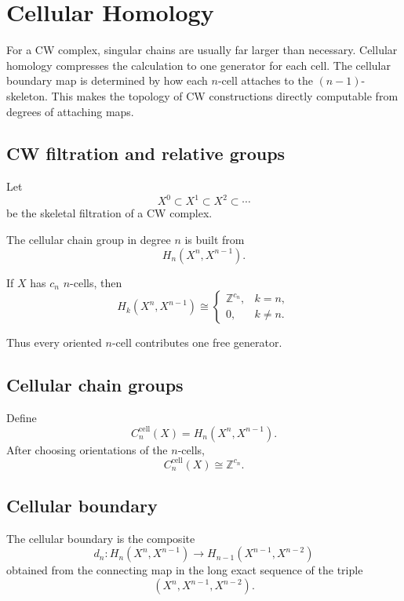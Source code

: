 ﻿\chapter{Cellular Homology}
\label{ch:viii18-cellular-homology}

For a CW complex, singular chains are usually far larger than necessary.
Cellular homology compresses the calculation to one generator for each cell.
The cellular boundary map is determined by how each \(n\)-cell attaches to the
\((n-1)\)-skeleton.  This makes the topology of CW constructions directly
computable from degrees of attaching maps.

\section{CW filtration and relative groups}

Let
\[
X^0\subset X^1\subset X^2\subset\cdots
\]
be the skeletal filtration of a CW complex.

The cellular chain group in degree \(n\) is built from
\[
H_n(X^n,X^{n-1}).
\]

\begin{theorem}
\label{thm:viii18-relative-cells}
If \(X\) has \(c_n\) \(n\)-cells, then
\[
H_k(X^n,X^{n-1})
\cong
\begin{cases}
\mathbb Z^{c_n},&k=n,\\
0,&k\ne n.
\end{cases}
\]
\end{theorem}

Thus every oriented \(n\)-cell contributes one free generator.

\section{Cellular chain groups}

\begin{definition}
\label{def:viii18-cellular-chain}
Define
\[
C_n^{\mathrm{cell}}(X)
=
H_n(X^n,X^{n-1}).
\]
After choosing orientations of the \(n\)-cells,
\[
C_n^{\mathrm{cell}}(X)\cong\mathbb Z^{c_n}.
\]
\end{definition}

\section{Cellular boundary}

The cellular boundary is the composite
\[
d_n:
H_n(X^n,X^{n-1})
\longrightarrow
H_{n-1}(X^{n-1},X^{n-2})
\]
obtained from the connecting map in the long exact sequence of the triple
\[
(X^n,X^{n-1},X^{n-2}).
\]

